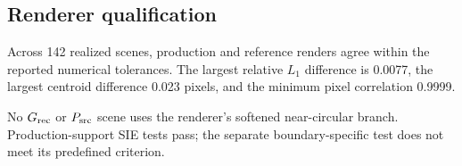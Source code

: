\subsection{Renderer qualification}
\label{sec:renderer_results}

Across 142 realized scenes, production and reference renders agree within the
reported numerical tolerances. The largest relative \(L_1\) difference is
0.0077, the largest centroid difference 0.023 pixels, and the minimum pixel
correlation 0.9999.

No \(G_{\rm rec}\) or \(P_{\rm src}\) scene uses the renderer's softened
near-circular branch. Production-support SIE tests pass; the separate
boundary-specific test does not meet its predefined criterion.
